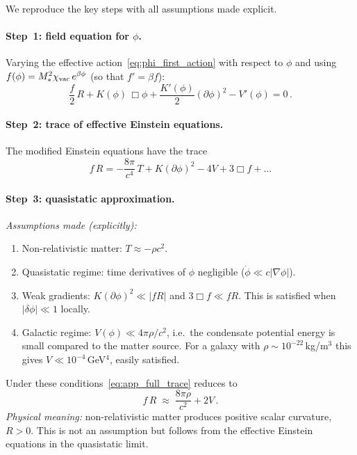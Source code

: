 \documentclass[11pt,a4paper]{article}
\numberwithin{equation}{section}
\begin{document}
We reproduce the key steps with all assumptions made explicit.

\paragraph{Step~1: field equation for $\phi$.}
Varying the effective action~\eqref{eq:phi_first_action}
with respect to $\phi$ and using
$f(\phi) = M_*^2\chi_{\rm vac}\,e^{\beta\phi}$ (so that $f' = \beta f$):
\begin{equation}
\frac{f}{2}\,R
+ K(\phi)\,\Box\phi
+ \frac{K'(\phi)}{2}(\partial\phi)^2
- V'(\phi) = 0\,.
\label{eq:app_phi_eom}
\end{equation}

\paragraph{Step~2: trace of effective Einstein equations.}
The modified Einstein equations have the trace
\begin{equation}
f\,R = -\frac{8\pi}{c^4}\,T
  + K(\partial\phi)^2 - 4V + 3\Box f + \ldots
\label{eq:app_full_trace}
\end{equation}

\paragraph{Step~3: quasistatic approximation.}
\emph{Assumptions made (explicitly):}
\begin{enumerate}[label=(\alph*)]
\item Non-relativistic matter: $T \approx -\rho c^2$.
\item Quasistatic regime: time derivatives of $\phi$ negligible
  ($\dot\phi \ll c|\nabla\phi|$).
\item Weak gradients: $K(\partial\phi)^2 \ll |fR|$ and
  $3\Box f \ll fR$. This is satisfied when
  $|\delta\phi| \ll 1$ locally.
\item Galactic regime: $V(\phi) \ll 4\pi\rho/c^2$, i.e.\
  the condensate potential energy is small compared to the
  matter source. For a galaxy with
  $\rho \sim 10^{-22}\,$kg/m$^3$ this gives
  $V \ll 10^{-4}\,$GeV$^4$, easily satisfied.
\end{enumerate}
Under these conditions~\eqref{eq:app_full_trace} reduces to
\begin{equation}
f\,R \;\approx\; \frac{8\pi\rho}{c^2} + 2V\,.
\label{eq:app_trace_quasistatic}
\end{equation}
\emph{Physical meaning:} non-relativistic matter produces
positive scalar curvature, $R > 0$. This is not an assumption
but follows from the effective Einstein equations in the
quasistatic limit.
\end{document}
